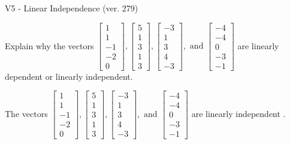 \begin{exercise}
  \begin{exerciseTitle}V5 - Linear Independence (ver. 279)\end{exerciseTitle}
  \begin{exerciseStatement}
    Explain why the vectors \(\left[\begin{array}{r}
1 \\
1 \\
-1 \\
-2 \\
0
\end{array}\right] , \left[\begin{array}{r}
5 \\
1 \\
3 \\
1 \\
3
\end{array}\right] , \left[\begin{array}{r}
-3 \\
1 \\
3 \\
4 \\
-3
\end{array}\right] , \text{ and } \left[\begin{array}{r}
-4 \\
-4 \\
0 \\
-3 \\
-1
\end{array}\right]\) are linearly dependent or linearly independent.	


  \end{exerciseStatement}
  \begin{exerciseAnswer}
   The vectors \(\left[\begin{array}{r}
1 \\
1 \\
-1 \\
-2 \\
0
\end{array}\right] , \left[\begin{array}{r}
5 \\
1 \\
3 \\
1 \\
3
\end{array}\right] , \left[\begin{array}{r}
-3 \\
1 \\
3 \\
4 \\
-3
\end{array}\right] , \text{ and } \left[\begin{array}{r}
-4 \\
-4 \\
0 \\
-3 \\
-1
\end{array}\right]\) are 
  	 linearly independent  .
  


  \end{exerciseAnswer}
\end{exercise}
